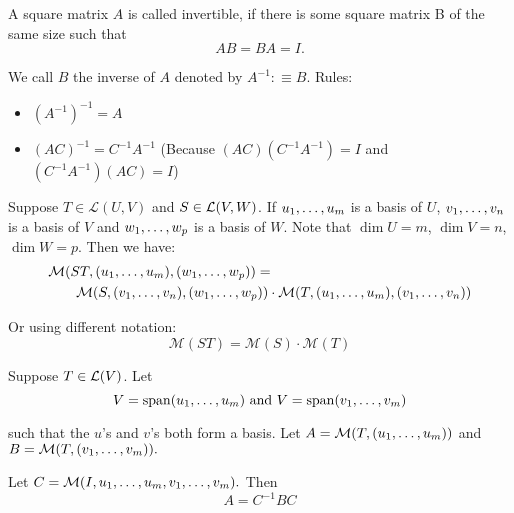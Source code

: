  \setcounter{thm}{79}
  \begin{mydef}
    A square matrix $A$ is called invertible, if there is some square matrix B of the same size such that
    \begin{equation}
    	AB=BA=I.
    \end{equation}

    We call $B$ the inverse of $A$ denoted by $A^{-1} :\equiv B$. Rules:
    \begin{itemize}
      \item $(A^{-1})^{-1}=A$
      \item $(AC)^{-1} = C^{-1}A^{-1}$ (Because $(AC)(C^{-1}A^{-1})=I$ and $(C^{-1}A^{-1})(AC)=I$)
    \end{itemize}
  \end{mydef}

  \begin{thm} 
    Suppose $T\in \mathcal{L}(U,V)$ and $S\in {\mathcal{L}(V,W)}$. If $u_1, \dots, u_m$ is a basis of $U$, $v_1, \dots, v_n$ is a basis of $V$ and $w_1, \dots, w_{p}$ is a basis of $W$. Note that $\dim U = m$, $\dim V = n$, $\dim W = p$. Then we have:
    \begin{equation}
    \begin{aligned}
      &\mathcal{M}(ST, (u_1, \dots, u_m), (w_1, \dots, w_{p})) = \\
      &\qquad \mathcal{M}(S, (v_1, \dots, v_n), (w_1, \dots, w_{p} ))
      \cdot
      \mathcal{M}(T, (u_1, \dots, u_m), (v_1, \dots, v_n   ))
    \end{aligned}
    \end{equation}

    Or using different notation:
    \begin{equation}
      \mathcal{M}(ST) = \mathcal{M}(S) \cdot \mathcal{M}(T)
    \end{equation}
  \end{thm}

  \setcounter{thm}{83}
  \begin{thm}
    Suppose $T \in \mathcal{L}(V)$. Let
    \begin{equation}
          V = \myspan{\onetillm{u}}
          $ and $V= \myspan{\onetillm{v}}
    \end{equation}

  such that the $u$'s and $v$'s both form a basis. Let $A=\mathcal{M}(T, (u_1, \dots, u_m))$ and $B=\mathcal{M}(T,(v_1, \dots, v_m)).$

   Let $C=\mathcal{M}(I, u_1, \dots, u_m, v_1, \dots, v_m).$ Then
    \begin{equation}
    A = C^{-1} B C
    \end{equation}
  \end{thm}

